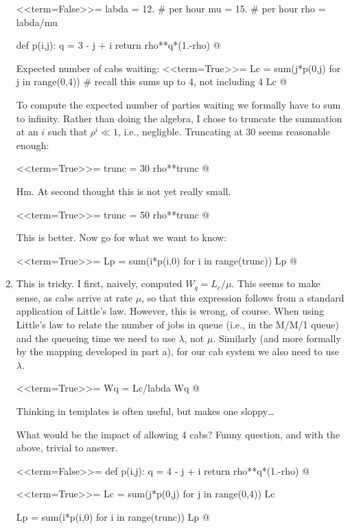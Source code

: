 \begin{question}
\begin{solution}
\begin{enumerate}
<<term=False>>=
labda = 12. # per hour
mu = 15. # per hour
rho = labda/mu

def p(i,j):
    q  = 3 - j + i
    return rho**q*(1.-rho)
@ 

Expected number of  cabs waiting:
<<term=True>>=
Lc = sum(j*p(0,j) for j in range(0,4)) # recall this sums up to 4, not including 4
Lc
@ 


To compute the expected number of parties waiting we formally have to
sum to infinity. Rather than doing the algebra, I chose to truncate
the summation at an $i$ such that $\rho^i \ll 1$, i.e.,
negligble.  Truncating at 30 seems reasonable enough:

<<term=True>>=
trunc = 30
rho**trunc
@ 

Hm. At second thought this is not yet really small. 

<<term=True>>=
trunc = 50
rho**trunc
@ 


This is better. Now go for what we want to know:

<<term=True>>=
Lp = sum(i*p(i,0) for i in range(trunc))
Lp
@ 

\item 
This is tricky. I first, naively, computed $W_q = L_c/\mu$. This
seems to make sense, as cabs arrive at rate $\mu$, so that this
expression follows from a standard application of Little's
law. However, this is wrong, of course. When using Little's law to
relate the number of jobs in queue (i.e., in the M/M/1 queue) and the
queueing time we need to use $\lambda$, not
$\mu$. Similarly (and more formally by the mapping developed in
part a), for our cab system we also need to use $\lambda$.

<<term=True>>=
Wq = Lc/labda
Wq
@ 

Thinking in templates is often useful, but makes one sloppy\ldots

What would be the impact of allowing 4 cabs? Funny question, and with the above, trivial to answer.

<<term=False>>=
def p(i,j):
    q  = 4 - j + i
    return rho**q*(1.-rho)
@ 

<<term=True>>=
Lc = sum(j*p(0,j) for j in range(0,4))
Lc

Lp = sum(i*p(i,0) for i in range(trunc))
Lp
@ 
  \end{enumerate}
    \end{solution}
\end{question}

